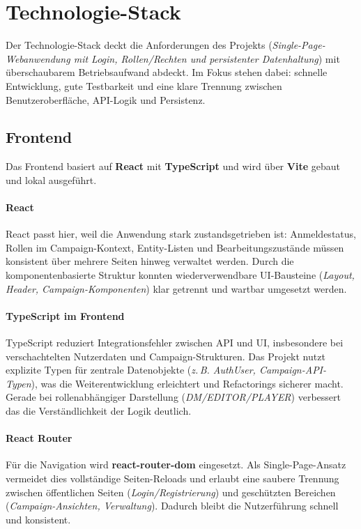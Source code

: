 \section{Technologie-Stack}

Der Technologie-Stack deckt die Anforderungen des Projekts
(\emph{Single-Page-Webanwendung mit Login, Rollen/Rechten und persistenter
Datenhaltung}) mit überschaubarem Betriebsaufwand abdeckt.
Im Fokus stehen dabei: schnelle Entwicklung, gute Testbarkeit und
eine klare Trennung zwischen Benutzeroberfläche, API-Logik und Persistenz.

\subsection{Frontend}

Das Frontend basiert auf \textbf{React} mit \textbf{TypeScript} und wird über
\textbf{Vite} gebaut und lokal ausgeführt.

\paragraph{React}
React passt hier, weil die Anwendung stark zustandsgetrieben ist:
Anmeldestatus, Rollen im Campaign-Kontext, Entity-Listen und
Bearbeitungszustände müssen konsistent über mehrere Seiten hinweg verwaltet
werden.
Durch die komponentenbasierte Struktur konnten wiederverwendbare UI-Bausteine
(\emph{Layout, Header, Campaign-Komponenten}) klar getrennt und wartbar
umgesetzt werden.

\paragraph{TypeScript im Frontend}
TypeScript reduziert Integrationsfehler zwischen API und UI, insbesondere bei
verschachtelten Nutzerdaten und Campaign-Strukturen.
Das Projekt nutzt explizite Typen für zentrale Datenobjekte
(\emph{z.\,B. AuthUser, Campaign-API-Typen}), was die Weiterentwicklung
erleichtert und Refactorings sicherer macht.
Gerade bei rollenabhängiger Darstellung (\emph{DM/EDITOR/PLAYER}) verbessert
das die Verständlichkeit der Logik deutlich.

\paragraph{React Router}
Für die Navigation wird \textbf{react-router-dom} eingesetzt.
Als Single-Page-Ansatz vermeidet dies vollständige Seiten-Reloads und erlaubt
eine saubere Trennung zwischen öffentlichen Seiten
(\emph{Login/Registrierung}) und geschützten Bereichen
(\emph{Campaign-Ansichten, Verwaltung}).
Dadurch bleibt die Nutzerführung schnell und konsistent.

